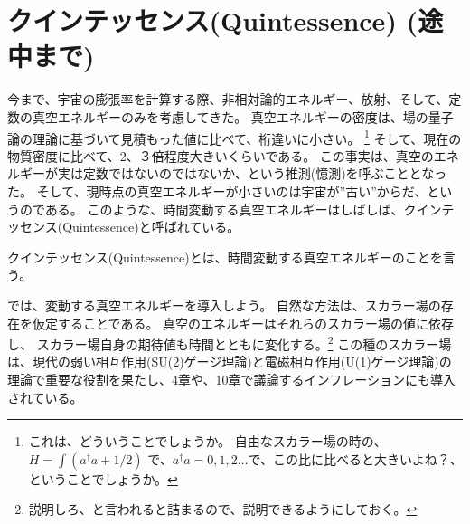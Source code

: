 \documentclass[11pt]{ltjsarticle}
\theoremstyle{plain}
\theoremstyle{break}
\begin{document}
\newpage
\section{クインテッセンス(Quintessence) (途中まで)}\label{sec1-12:Quintessence}

今まで、宇宙の膨張率を計算する際、非相対論的エネルギー、放射、そして、定数の真空エネルギーのみを考慮してきた。
真空エネルギーの密度は、場の量子論の理論に基づいて見積もった値に比べて、桁違いに小さい。
\footnote{これは、どういうことでしょうか。
自由なスカラー場の時の、$H= \int {(a^{\dagger}a +1/2)}$ で、$a^{\dagger}a = 0,1,2 \dots $で、この比に比べると大きいよね？、ということでしょうか。}
そして、現在の物質密度に比べて、2、３倍程度大きいくらいである。
この事実は、真空のエネルギーが実は定数ではないのではないか、という推測(憶測)を呼ぶこととなった。
そして、現時点の真空エネルギーが小さいのは宇宙が”古い”からだ、というのである。
このような、時間変動する真空エネルギーはしばしば、クインテッセンス(Quintessence)と呼ばれている。
\begin{definition}
クインテッセンス(Quintessence)とは、時間変動する真空エネルギーのことを言う。
\end{definition}

では、変動する真空エネルギーを導入しよう。
自然な方法は、スカラー場の存在を仮定することである。
真空のエネルギーはそれらのスカラー場の値に依存し、
スカラー場自身の期待値も時間とともに変化する。\footnote{説明しろ、と言われると詰まるので、説明できるようにしておく。}
この種のスカラー場は、現代の弱い相互作用(SU(2)ゲージ理論)と電磁相互作用(U(1)ゲージ理論)の理論で重要な役割を果たし、4章や、10章で議論するインフレーションにも導入されている。
\end{document}
